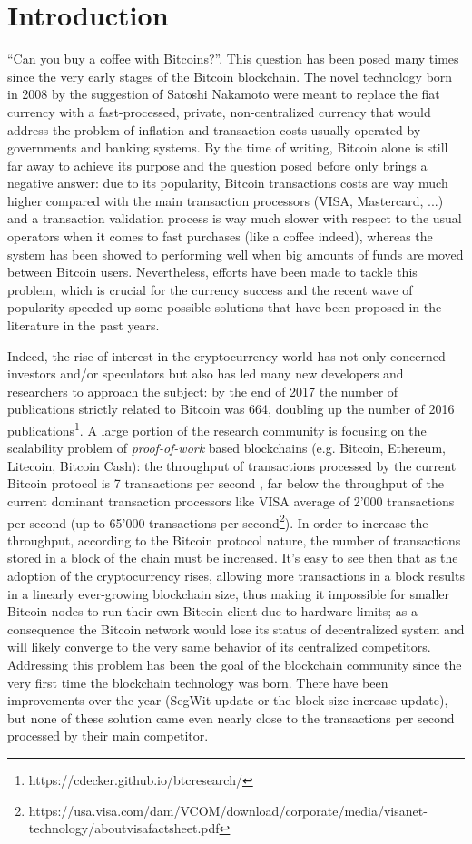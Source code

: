 
	\chapter{Introduction}
		``Can you buy a coffee with Bitcoins?''.
		This question has been posed many times since the very early stages of the Bitcoin blockchain. The novel technology born in 2008 by the suggestion of Satoshi Nakamoto \cite{Nakamoto2008} were meant to replace the fiat currency with a fast-processed, private, non-centralized currency that would address the problem of inflation and transaction costs usually operated by governments and banking systems. By the time of writing, Bitcoin alone is still far away to achieve its purpose and the question posed before only brings a negative answer: due to its popularity, Bitcoin transactions costs are way much higher compared with the main transaction processors (VISA, Mastercard, ...) and a transaction validation process is way much slower with respect to the usual operators when it comes to fast purchases (like a coffee indeed), whereas the system has been showed to performing well when big amounts of funds are moved between Bitcoin users. Nevertheless, efforts have been made to tackle this problem, which is crucial for the currency success and the recent wave of popularity speeded up some possible solutions that have been proposed in the literature in the past years.		
		
		Indeed, the rise of interest in the cryptocurrency world has not only concerned investors and/or speculators but also has led many new developers and researchers to approach the subject: by the end of 2017 the number of publications strictly related to Bitcoin was 664, doubling up the number of 2016  publications\footnote{https://cdecker.github.io/btcresearch/}. A large portion of the research community is focusing on the scalability problem of \textit{proof-of-work} based blockchains (e.g. Bitcoin, Ethereum, Litecoin, Bitcoin Cash): the throughput of transactions processed by the current Bitcoin protocol is 7 transactions per second \cite{Decker2013}, far below the throughput of the current dominant transaction processors like VISA average of 2'000 transactions per second (up to 65'000 transactions per second\footnote{https://usa.visa.com/dam/VCOM/download/corporate/media/visanet-technology/aboutvisafactsheet.pdf}). In order to increase the throughput, according to the Bitcoin protocol nature, the number of transactions stored in a block of the chain must be increased. It's easy to see then that as the adoption of the cryptocurrency rises, allowing more transactions in a block results in a linearly ever-growing blockchain size, thus making it impossible for smaller Bitcoin nodes to run their own Bitcoin client due to hardware limits; as a consequence the Bitcoin network would lose its status of decentralized system and will likely converge to the very same behavior of its centralized competitors. Addressing this problem has been the goal of the blockchain community since the very first time the blockchain technology was born. There have been improvements over the year (SegWit update or the block size increase update), but none of these solution came even nearly close to the transactions per second processed by their main competitor.
		
